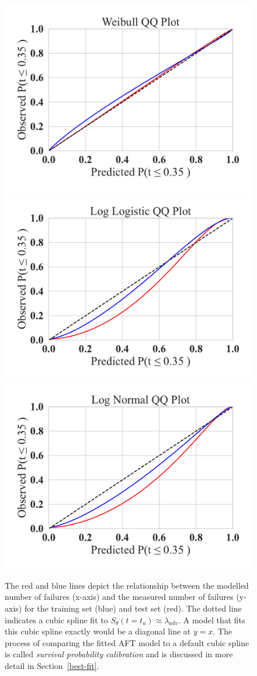 \documentclass[sn-mathphys-num]{sn-jnl}%
\begin{document}
\begin{figure}[tph!]
    \centering
        \includegraphics[width=.49\linewidth]{plots/combined/weibull_qq.pdf}
        \includegraphics[width=.49\linewidth]{plots/combined/log_logistic_qq.pdf}
        \includegraphics[width=.49\linewidth]{plots/combined/log_normal_qq.pdf}
    \caption{The red and blue lines depict the relationship between the modelled number of failures (x-axis) and the measured number of failures (y-axis) for the training set (blue) and test set (red). The dotted line indicates a cubic spline fit to $S_{\theta}(t=t_a) \approx \lambda_{adv} $. A model that fits this cubic spline exactly would be a diagonal line at $y=x$. The process of comparing the fitted AFT model to a default cubic spline is called \textit{survival probability calibration} and is discussed in more detail in Section~\ref{best-fit}.}
    \label{fig:qq}
\end{figure}
\end{document}
